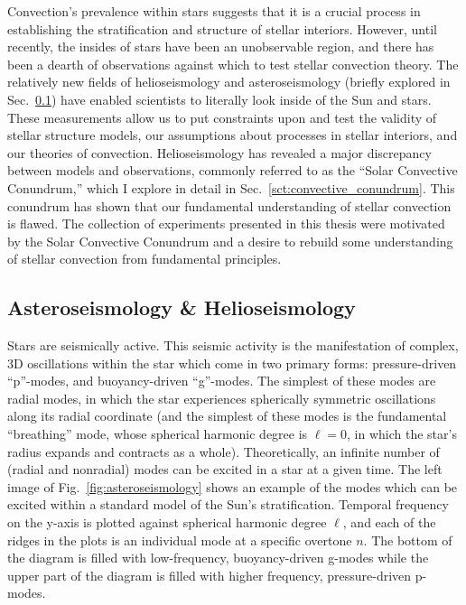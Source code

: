 Convection's prevalence within stars suggests that it is a crucial process in establishing the stratification and structure of stellar interiors.
However, until recently, the insides of stars have been an unobservable region, and there has been a dearth of observations against which to test stellar convection theory.
The relatively new fields of helioseismology and asteroseismology (briefly explored in Sec.~\ref{sct:asteroseismology}) have enabled scientists to literally look inside of the Sun and stars.
These measurements allow us to put constraints upon and test the validity of stellar structure models, our assumptions about processes in stellar interiors, and our theories of convection.
Helioseismology has revealed a major discrepancy between models and observations, commonly referred to as the ``Solar Convective Conundrum,'' which I explore in detail in Sec.~\ref{sct:convective_conundrum}.
This conundrum has shown that our fundamental understanding of stellar convection is flawed.
The collection of experiments presented in this thesis were motivated by the Solar Convective Conundrum and a desire to rebuild some understanding of stellar convection from fundamental principles.

\subsection{Asteroseismology \& Helioseismology}
\label{sct:asteroseismology}
Stars are seismically active.
This seismic activity is the manifestation of complex, 3D oscillations within the star which come in two primary forms: pressure-driven ``p''-modes, and buoyancy-driven ``g''-modes.
The simplest of these modes are radial modes, in which the star experiences spherically symmetric oscillations along its radial coordinate (and the simplest of these modes is the fundamental ``breathing'' mode, whose spherical harmonic degree is $\ell = 0$, in which the star's radius expands and contracts as a whole).
Theoretically, an infinite number of (radial and nonradial) modes can be excited in a star at a given time.
The left image of Fig.~\ref{fig:asteroseismology} shows an example of the modes which can be excited within a standard model of the Sun's stratification.
Temporal frequency on the y-axis is plotted against spherical harmonic degree $\ell$, and each of the ridges in the plots is an individual mode at a specific overtone $n$.
The bottom of the diagram is filled with low-frequency, buoyancy-driven g-modes while the upper part of the diagram is filled with higher frequency, pressure-driven p-modes.

